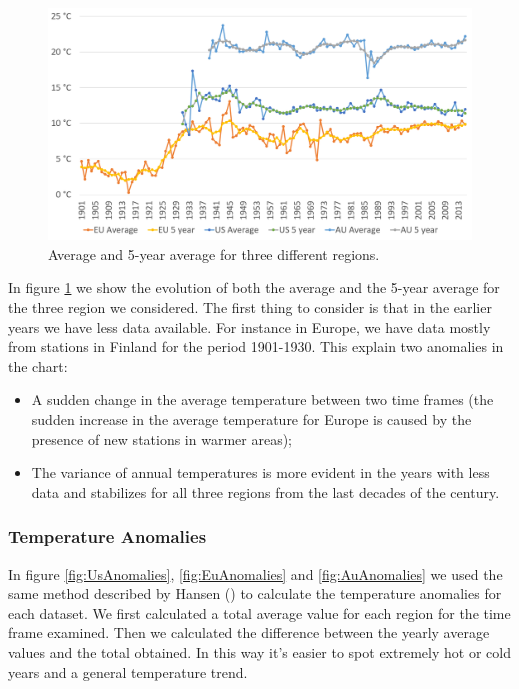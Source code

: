 \documentclass{vldb}
\begin{document}
\begin{figure}[tbh]
\includegraphics[width=1\linewidth]{averageRegions}
\caption{Average and 5-year average for three different regions.}
\label{fig:averageRegions}
\end{figure}

In figure \ref{fig:averageRegions} we show the evolution of both the average and the 5-year average for the three region we considered. The first thing to consider is that in the earlier years we have less data available. For instance in Europe, we have data mostly from stations in Finland for the period 1901-1930. This explain two anomalies in the chart:
\begin{itemize}
    \item A sudden change in the average temperature between two time frames (the sudden increase in the average temperature for Europe is caused by the presence of new stations in warmer areas);
    \item The variance of annual temperatures is more evident in the years with less data and stabilizes for all three regions from the last decades of the century.
\end{itemize}

\subsubsection{Temperature Anomalies}
In figure \ref{fig:UsAnomalies}, \ref{fig:EuAnomalies} and \ref{fig:AuAnomalies} we used the same method described by Hansen (\cite{hansen1999giss}) to calculate the temperature anomalies for each dataset. We first calculated a total average value for each region for the time frame examined. Then we calculated the difference between the yearly average values and the total obtained. In this way it's easier to spot extremely hot or cold years and a general temperature trend.
\end{document}
